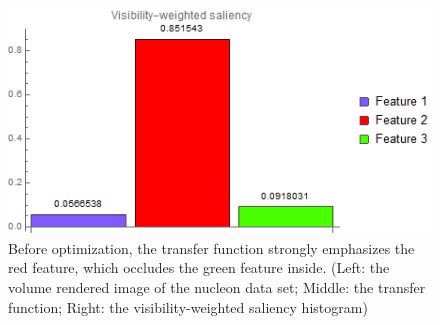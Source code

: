 \begin{figure}
\begin{minipage}{.2\textwidth}
	\end{minipage}~
	\begin{minipage}{.4\textwidth}
		\includegraphics[width=1\linewidth]{images/nucleon_strong_red_visibility_saliency_weighted_chart}
	\end{minipage}
	\caption{Before optimization, the transfer function strongly emphasizes the red feature, which occludes the green feature inside. (Left: the volume rendered image of the nucleon data set; Middle: the transfer function; Right: the visibility-weighted saliency histogram)}
	\label{fig:nucleon_strong_red}
\end{figure}

